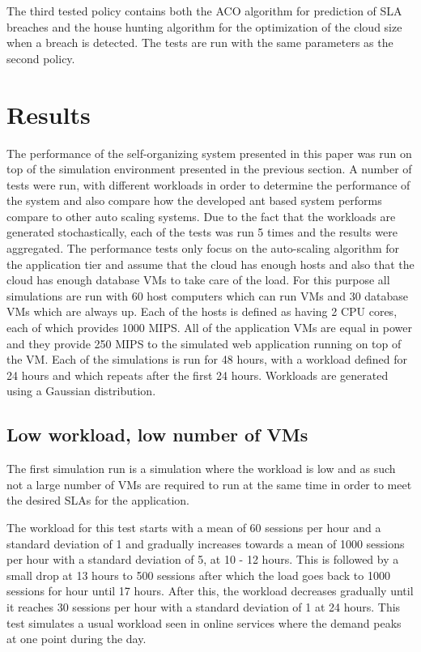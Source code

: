 \documentclass[conference]{IEEEtran}
\begin{document}
The third tested policy contains both the ACO algorithm for prediction of SLA breaches and the house hunting algorithm for the optimization of the cloud size when a breach is detected. The tests are run with the same parameters as the second policy.

\section{Results}
\label{sec:results}

The performance of the self-organizing system presented in this paper was run on top of the simulation environment presented in the previous section. A number of tests were run, with different workloads in order to determine the performance of the system and also compare how the developed ant based system performs compare to other auto scaling systems. Due to the fact that the workloads are generated stochastically, each of the tests was run 5 times and the results were aggregated. The performance tests only focus on the auto-scaling algorithm for the application tier and assume that the cloud has enough hosts and also that the cloud has enough database VMs to take care of the load. For this purpose all simulations are run with 60 host computers which can run VMs and 30 database VMs which are always up. Each of the hosts is defined as having 2 CPU cores, each of which provides 1000 MIPS. All of the application VMs are equal in power and they provide 250 MIPS to the simulated web application running on top of the VM. Each of the simulations is run for 48 hours, with a workload defined for 24 hours and which repeats after the first 24 hours. Workloads are generated using a Gaussian distribution.

\subsection{Low workload, low number of VMs}

The first simulation run is a simulation where the workload is low and as such not a large number of VMs are required to run at the same time in order to meet the desired SLAs for the application.

The workload for this test starts with a mean of 60 sessions per hour and a standard deviation of 1 and gradually increases towards a mean of 1000 sessions per hour with a standard deviation of 5, at 10 - 12 hours. This is followed by a small drop at 13 hours to 500 sessions after which the load goes back to 1000 sessions for hour until 17 hours. After this, the workload decreases gradually until it reaches 30 sessions per hour with a standard deviation of 1 at 24 hours. This test simulates a usual workload seen in online services where the demand peaks at one point during the day.
\end{document}
